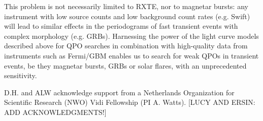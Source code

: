 \documentclass[numberedappendix]{emulateapj}
\begin{document}
This problem is not necessarily limited to RXTE, nor to magnetar bursts: any instrument with low source counts and low background count rates (e.g. Swift) will lead to similar effects in the periodograms of fast transient events with complex morphology (e.g. GRBs). Harnessing the power of the light curve models described above for QPO searches in combination with high-quality data from instruments such as Fermi/GBM enables us to search for weak QPOs in transient events, be they magnetar bursts, GRBs or solar flares, with an unprecedented sensitivity. 


\acknowledgments
D.H. and ALW acknowledge support from a Netherlands Organization for Scientific Research (NWO) Vidi Fellowship (PI A. Watts).  
[LUCY AND ERSIN: ADD ACKNOWLEDGMENTS!]



\end{document}
